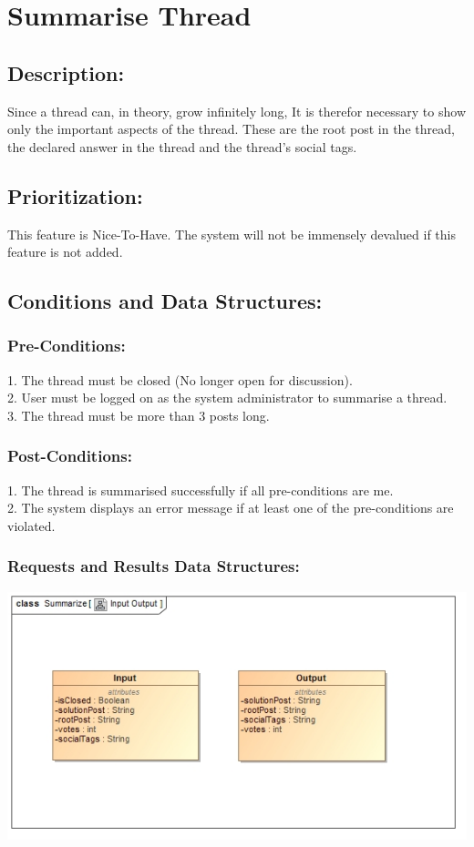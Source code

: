\documentclass[a4paper,11pt]{article}
\begin{document}
\section{Summarise Thread}
\subsection*{Description:}
Since a thread can, in theory, grow infinitely long, It is therefor necessary to show only the important aspects of the thread. These are the root post in the thread, the declared answer in the thread and the thread's social tags.\\
\subsection{Prioritization:}
This feature is Nice-To-Have. The system will not be immensely devalued if this feature is not added.\\ 
\subsection{Conditions and Data Structures:}
\subsubsection*{Pre-Conditions:}
1.	The thread must be closed (No longer open for discussion).\\
2.	User must be logged on as the system administrator to summarise a thread.\\
3.	The thread must be more than 3 posts long.\\
\subsubsection*{Post-Conditions:}
1.	The thread is summarised successfully if all pre-conditions are me.\\
2.	The system displays an error message if at least one of the pre-conditions are violated.\\
\subsubsection*{Requests and Results Data Structures:}
\includegraphics{Images/SCHMThread/SummarizeInOut.jpg}\\
\end{document}

